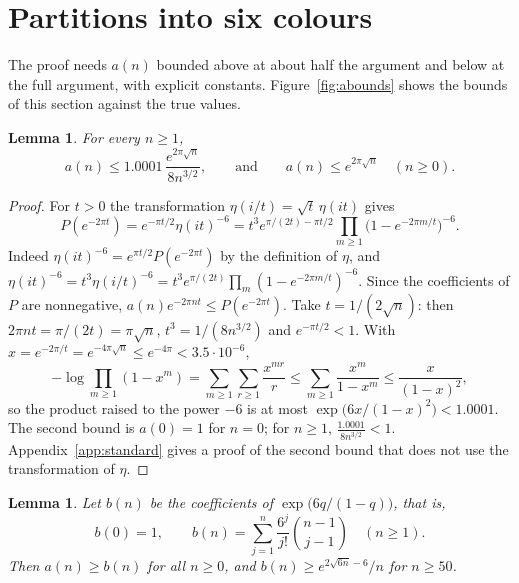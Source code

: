 \documentclass[11pt]{amsart}
\newtheorem{lemma}[theorem]{Lemma}
\theoremstyle{definition}
\begin{document}
\section{Partitions into six colours}\label{sec:a}

The proof needs $a(n)$ bounded above at about half the argument and below at the full argument, with explicit constants. Figure~\ref{fig:abounds} shows the bounds of this section against the true values.

\begin{lemma}\label{lem:aupper}
For every $n\ge1$,
\[
a(n)\le 1.0001\,\frac{e^{2\pi\sqrt n}}{8n^{3/2}},\qquad\text{and}\qquad a(n)\le e^{2\pi\sqrt n}\quad(n\ge0).
\]
\end{lemma}

\begin{proof}
For $t>0$ the transformation $\eta(i/t)=\sqrt t\,\eta(it)$ \cite[Thm.~3.1]{Apo90} gives
\[
P(e^{-2\pi t})=e^{-\pi t/2}\eta(it)^{-6}=t^3e^{\pi/(2t)-\pi t/2}\prod_{m\ge1}\bigl(1-e^{-2\pi m/t}\bigr)^{-6}.
\]
Indeed $\eta(it)^{-6}=e^{\pi t/2}P(e^{-2\pi t})$ by the definition of $\eta$, and $\eta(it)^{-6}=t^3\eta(i/t)^{-6}=t^3e^{\pi/(2t)}\prod_m(1-e^{-2\pi m/t})^{-6}$. Since the coefficients of $P$ are nonnegative, $a(n)e^{-2\pi nt}\le P(e^{-2\pi t})$. Take $t=1/(2\sqrt n)$: then $2\pi nt=\pi/(2t)=\pi\sqrt n$, $t^3=1/(8n^{3/2})$ and $e^{-\pi t/2}<1$. With $x=e^{-2\pi/t}=e^{-4\pi\sqrt n}\le e^{-4\pi}<3.5\cdot10^{-6}$,
\[
-\log\prod_{m\ge1}(1-x^m)=\sum_{m\ge1}\sum_{r\ge1}\frac{x^{mr}}{r}\le\sum_{m\ge1}\frac{x^m}{1-x^m}\le\frac{x}{(1-x)^2},
\]
so the product raised to the power $-6$ is at most $\exp\bigl(6x/(1-x)^2\bigr)<1.0001$. The second bound is $a(0)=1$ for $n=0$; for $n\ge1$, $\frac{1.0001}{8n^{3/2}}<1$. Appendix~\ref{app:standard} gives a proof of the second bound that does not use the transformation of $\eta$.
\end{proof}

\begin{lemma}\label{lem:alower}
Let $b(n)$ be the coefficients of $\exp\bigl(6q/(1-q)\bigr)$, that is,
\[
b(0)=1,\qquad b(n)=\sum_{j=1}^{n}\frac{6^j}{j!}\binom{n-1}{j-1}\quad(n\ge1).
\]
Then $a(n)\ge b(n)$ for all $n\ge0$, and $b(n)\ge e^{2\sqrt{6n}-6}/n$ for $n\ge50$.
\end{lemma}
\end{document}
